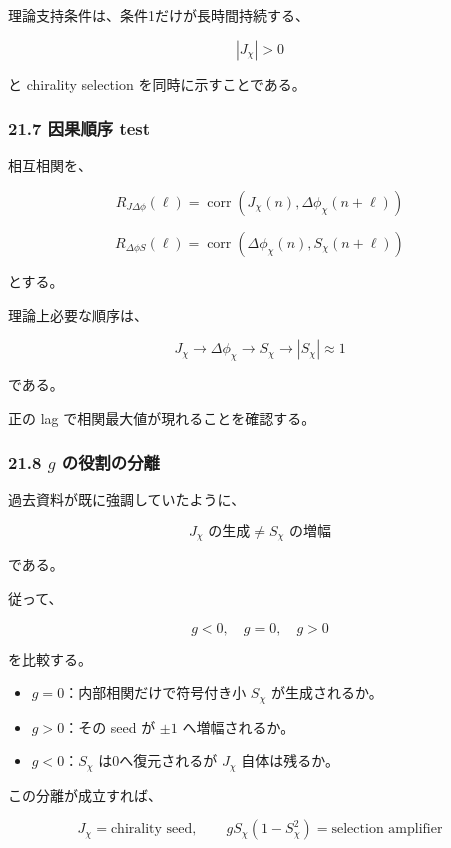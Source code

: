\documentclass[
  a4paper,
]{ltjsarticle}
\providecommand{\tightlist}{%
  \setlength{\itemsep}{0pt}\setlength{\parskip}{0pt}}
\begin{document}
理論支持条件は、条件1だけが長時間持続する、

\[
|J_\chi|>0
\]

と chirality selection を同時に示すことである。

\subsubsection{21.7 因果順序 test}\label{ux56e0ux679cux9806ux5e8f-test}

相互相関を、

\[
R_{J\Delta\phi}(\ell)
=
\operatorname{corr}
\left(
J_\chi(n),
\Delta\phi_\chi(n+\ell)
\right)
\]

\[
R_{\Delta\phi S}(\ell)
=
\operatorname{corr}
\left(
\Delta\phi_\chi(n),
S_\chi(n+\ell)
\right)
\]

とする。

理論上必要な順序は、

\[
\boxed{
J_\chi
\to
\Delta\phi_\chi
\to
S_\chi
\to
|S_\chi|\approx1
}
\tag{188}
\]

である。

正の lag で相関最大値が現れることを確認する。

\subsubsection{\texorpdfstring{21.8 \(g\)
の役割の分離}{21.8 g の役割の分離}}\label{g-ux306eux5f79ux5272ux306eux5206ux96e2}

過去資料が既に強調していたように、

\[
\boxed{
J_\chi\text{ の生成}
\neq
S_\chi\text{ の増幅}
}
\tag{189}
\]

である。

従って、

\[
g<0,\quad g=0,\quad g>0
\]

を比較する。

\begin{itemize}
\tightlist
\item
  \(g=0\)：内部相関だけで符号付き小 \(S_\chi\) が生成されるか。
\item
  \(g>0\)：その seed が \(\pm1\) へ増幅されるか。
\item
  \(g<0\)：\(S_\chi\) は0へ復元されるが \(J_\chi\) 自体は残るか。
\end{itemize}

この分離が成立すれば、

\[
\boxed{
J_\chi
=
\text{chirality seed},
\qquad
gS_\chi(1-S_\chi^2)
=
\text{selection amplifier}
}
\tag{190}
\]
\end{document}
